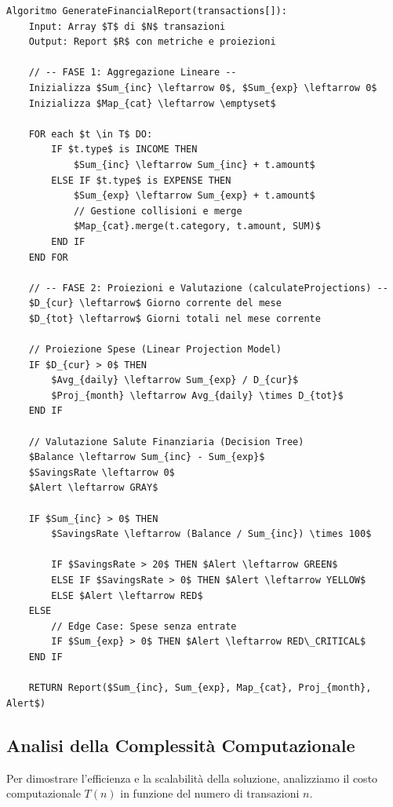 \begin{lstlisting}[mathescape=true, label={lst:pseudocode_analytics}]
Algoritmo GenerateFinancialReport(transactions[]):
    Input: Array $T$ di $N$ transazioni
    Output: Report $R$ con metriche e proiezioni

    // -- FASE 1: Aggregazione Lineare --
    Inizializza $Sum_{inc} \leftarrow 0$, $Sum_{exp} \leftarrow 0$
    Inizializza $Map_{cat} \leftarrow \emptyset$

    FOR each $t \in T$ DO:
        IF $t.type$ is INCOME THEN
            $Sum_{inc} \leftarrow Sum_{inc} + t.amount$
        ELSE IF $t.type$ is EXPENSE THEN
            $Sum_{exp} \leftarrow Sum_{exp} + t.amount$
            // Gestione collisioni e merge
            $Map_{cat}.merge(t.category, t.amount, SUM)$
        END IF
    END FOR

    // -- FASE 2: Proiezioni e Valutazione (calculateProjections) --
    $D_{cur} \leftarrow$ Giorno corrente del mese
    $D_{tot} \leftarrow$ Giorni totali nel mese corrente

    // Proiezione Spese (Linear Projection Model)
    IF $D_{cur} > 0$ THEN
        $Avg_{daily} \leftarrow Sum_{exp} / D_{cur}$
        $Proj_{month} \leftarrow Avg_{daily} \times D_{tot}$
    END IF

    // Valutazione Salute Finanziaria (Decision Tree)
    $Balance \leftarrow Sum_{inc} - Sum_{exp}$
    $SavingsRate \leftarrow 0$
    $Alert \leftarrow GRAY$

    IF $Sum_{inc} > 0$ THEN
        $SavingsRate \leftarrow (Balance / Sum_{inc}) \times 100$
        
        IF $SavingsRate > 20$ THEN $Alert \leftarrow GREEN$
        ELSE IF $SavingsRate > 0$ THEN $Alert \leftarrow YELLOW$
        ELSE $Alert \leftarrow RED$
    ELSE
        // Edge Case: Spese senza entrate
        IF $Sum_{exp} > 0$ THEN $Alert \leftarrow RED\_CRITICAL$
    END IF

    RETURN Report($Sum_{inc}, Sum_{exp}, Map_{cat}, Proj_{month}, Alert$)
\end{lstlisting}

\subsection{Analisi della Complessità Computazionale}

Per dimostrare l'efficienza e la scalabilità della soluzione, analizziamo il costo computazionale $T(n)$ in funzione del numero di transazioni $n$.

